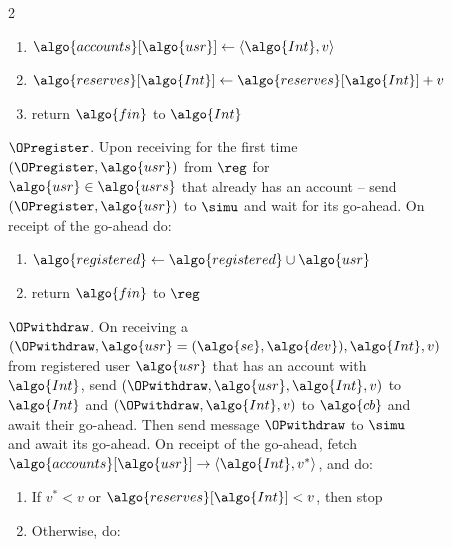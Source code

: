 \begin{figure}
\begin{minipage}{1.1\textwidth}
\begin{framed}
\begin{multicols}{2}
\begin{enumerate}
\begin{enumerate}
              \item $\algo{accounts}[\algo{usr}] \leftarrow \langle \algo{Int},
                v\rangle$

              \item $\algo{reserves}[\algo{Int}] \leftarrow
                \algo{reserves}[\algo{Int}]+v$

              \item return $\algo{fin}$ to $\algo{Int}$

            \end{enumerate}

        \end{enumerate}

        {$\OPregister$.} Upon receiving for the first time
        $(\OPregister, \algo{usr})$ from $\reg$ for $\algo{usr} \in
        \algo{usrs}$ that already has an account -- send $(\OPregister,
        \algo{usr})$ to $\simu$ and wait for its go-ahead. On receipt of the
        go-ahead do:

        \begin{enumerate}

          \item $\algo{registered} \gets \algo{registered} \cup \algo{usr}$

          \item return $\algo{fin}$ to $\reg$

        \end{enumerate}

        {$\OPwithdraw$.} On receiving a $(\OPwithdraw, \algo{usr} =
        (\algo{se}, \algo{dev}), \algo{Int}, v)$ from registered user
        $\algo{usr}$ that has an account with $\algo{Int}$, send
        $(\OPwithdraw, \algo{usr}, \algo{Int}, v)$ to $\algo{Int}$ and
        $(\OPwithdraw, \algo{Int}, v)$ to $\algo{cb}$ and await their
        go-ahead. Then send message $\OPwithdraw$ to $\simu$ and await its
        go-ahead. On receipt of the go-ahead, fetch
        $\algo{accounts}[\algo{usr}] \rightarrow \langle \algo{Int},
        v^*\rangle$, and do:

        \begin{enumerate}

          \item If $v^* < v$ or  $\algo{reserves}[\algo{Int}] < v$, then stop

          \item Otherwise, do:

            \begin{enumerate}


\end{enumerate}
\end{enumerate}
\end{multicols}
\end{framed}
\end{minipage}
\end{figure}
